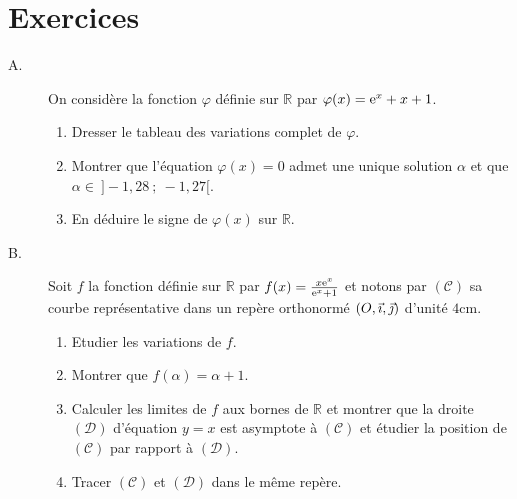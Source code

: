 \section{Exercices}
\begin{exo}
\begin{description}
\item[A.] On consid\`ere la fonction $\varphi$ d\'efinie sur $\mathbb{R}$ par $\varphi(x) = \mathrm{e}^{x} + x + 1$.
      \begin{enumerate}
      \item Dresser le tableau des variations complet de $\varphi$.
      \item Montrer que l'\'equation $\varphi (x) = 0$ admet une unique solution $\alpha$ et que 
            ${\alpha \in \ ] -1,28 \ ; \ -1,27 [}$.
      \item En d\'eduire le signe de $\varphi (x)$ sur $\mathbb{R}$.
      \end{enumerate}
\item[B.] Soit $f$ la fonction d\'efinie sur $\mathbb{R}$ par $f(x) = \frac{x \mathrm{e}^{x}}{\mathrm{e}^{x} + 1}$ et notons par 
      $(\mathcal{C})$ sa courbe repr\'esentative dans un rep\`ere orthonorm\'e $(O , \vec{\imath} , \vec{\jmath} )$ d'unit\'e $4 \text{cm}$.
      \begin{enumerate}
      \item Etudier les variations de $f$.
      \item Montrer que $f(\alpha) = \alpha + 1$.
      \item Calculer les limites de $f$ aux bornes de $\mathbb{R}$ et montrer que la droite $(\mathcal{D})$ d'\'equation 
            $y = x$ est asymptote \`a $(\mathcal{C})$ et \'etudier la position de $(\mathcal{C})$ par rapport \`a $(\mathcal{D})$.
      \item Tracer $(\mathcal{C})$ et $(\mathcal{D})$ dans le m\^eme rep\`ere.
      \end{enumerate}
\end{description}
\end{exo}
